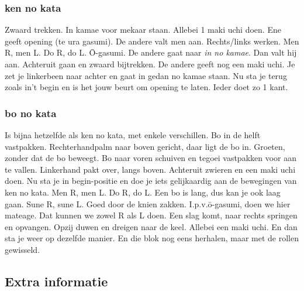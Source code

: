 \subsubsection{ken no kata}
Zwaard trekken. In kamae voor mekaar staan. Allebei 1 maki uchi doen.
Ene geeft opening (te ura gasumi). De andere valt men aan.
Rechts/links werken.
Men R, men L.
Do R, do L.
\={O}-gasumi. De andere gaat naar \textit{in no kamae}. Dan valt hij aan. Achteruit gaan en zwaard bijtrekken.
De andere geeft nog een maki uchi. Je zet je linkerbeen naar achter en gaat in gedan no kamae staan.
Nu sta je terug zoals in't begin en is het jouw beurt om opening te laten.
Ieder doet zo 1 kant.

\subsubsection{bo no kata}
Is bijna hetzelfde als ken no kata, met enkele verschillen.
Bo in de helft vastpakken. Rechterhandpalm naar boven gericht, daar ligt de bo in.
Groeten, zonder dat de bo beweegt.
Bo naar voren schuiven en tegoei vastpakken voor aan te vallen. Linkerhand pakt over, langs boven. Achteruit zwieren en een maki uchi doen. Nu sta je in begin-positie en doe je iets gelijkaardig aan de bewegingen van ken no kata.
Men R, men L.
Do R, do L.
Een bo is lang, dus kan je ook laag gaan.
Sune R, sune L. Goed door de knien zakken.
I.p.v.\={o}-gasumi, doen we hier mateage. Dat kunnen we zowel R als L doen.
Een slag komt, naar rechts springen en opvangen. Opzij duwen en dreigen naar de keel.
Allebei een maki uchi. En dan sta je weer op dezelfde manier.
En die blok nog eens herhalen, maar met de rollen gewisseld.

\subsection{Extra informatie}
